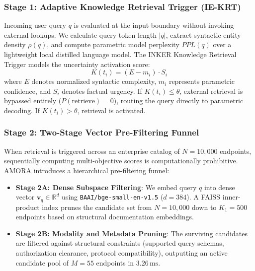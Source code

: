 \documentclass[fleqn,10pt]{article}
\begin{document}
\subsubsection{Stage 1: Adaptive Knowledge Retrieval Trigger (IE-KRT)}
Incoming user query $q$ is evaluated at the input boundary without invoking external lookups. We calculate query token length $|q|$, extract syntactic entity density $\rho(q)$, and compute parametric model perplexity $PPL(q)$ over a lightweight local distilled language model. The INKER Knowledge Retrieval Trigger models the uncertainty activation score:
\begin{equation}
K(t_i) = (E - m_i) \cdot S_i
\label{eq:uncertainty}
\end{equation}
where $E$ denotes normalized syntactic complexity, $m_i$ represents parametric confidence, and $S_i$ denotes factual urgency. If $K(t_i) \le \theta$, external retrieval is bypassed entirely ($P(\text{retrieve}) = 0$), routing the query directly to parametric decoding. If $K(t_i) > \theta$, retrieval is activated.

\subsubsection{Stage 2: Two-Stage Vector Pre-Filtering Funnel}
When retrieval is triggered across an enterprise catalog of $N = 10{,}000$ endpoints, sequentially computing multi-objective scores is computationally prohibitive. AMORA introduces a hierarchical pre-filtering funnel:
\begin{itemize}[leftmargin=1.5em]
    \item \textbf{Stage 2A: Dense Subspace Filtering}: We embed query $q$ into dense vector $\mathbf{v}_q \in \mathbb{R}^d$ using \texttt{BAAI/bge-small-en-v1.5} ($d=384$). A FAISS inner-product index prunes the candidate set from $N=10{,}000$ down to $K_1 = 500$ endpoints based on structural documentation embeddings.
    \item \textbf{Stage 2B: Modality and Metadata Pruning}: The surviving candidates are filtered against structural constraints (supported query schemas, authorization clearance, protocol compatibility), outputting an active candidate pool of $M = 55$ endpoints in $3.26\,\text{ms}$.
\end{itemize}
\end{document}
